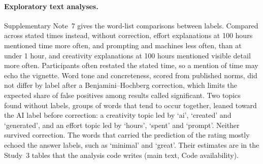\paragraph*{Exploratory text analyses.}
Supplementary Note~7 gives the word-list comparisons between labels. Compared across stated times instead, without correction, effort explanations at 100 hours mentioned time more often, and prompting and machines less often, than at under 1 hour, and creativity explanations at 100 hours mentioned visible detail more often. Participants often restated the stated time, so a mention of time may echo the vignette. Word tone and concreteness, scored from published norms, did not differ by label after a Benjamini--Hochberg correction, which limits the expected share of false positives among results called significant. Two topics found without labels, groups of words that tend to occur together, leaned toward the AI label before correction: a creativity topic led by `ai', `created' and `generated', and an effort topic led by `hours', `spent' and `prompt'. Neither survived correction. The words that carried the prediction of the rating mostly echoed the answer labels, such as `minimal' and `great'. Their estimates are in the Study~3 tables that the analysis code writes (main text, Code availability).
